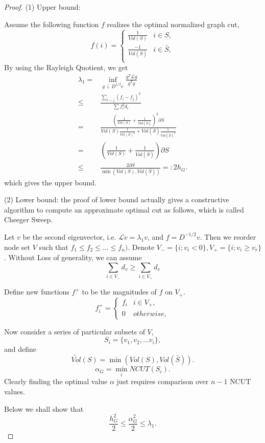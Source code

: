 \documentclass[twoside]{article}
\theoremstyle{definition}
\theoremstyle{definition}
\theoremstyle{remark}
\def\L{{\mathcal L}}
\begin{document}
\begin{proof}
(1) Upper bound:

Assume the following function $f$ realizes the optimal normalized graph cut,
\[
f(i)=
\left\{
\begin{array}{cc}
\frac{1}{Vol(S)} & i\in S , \\
\frac{-1}{Vol(\bar{S})} & i\in \bar{S} ,\\
\end{array}
\right.
\]
By using the Rayleigh Quotient, we get
\begin{equation*}
\begin{split}
\lambda_1=&\inf_{g\perp D^{1/2}e}\frac{g^T\mathcal L g}{g^Tg}\\
\le & \frac{\sum_{i\sim j}(f_i-f_j)^2}{\sum f_i^2d_i}\\
=& \frac{(\frac{1}{Vol(S)}+\frac{1}{Vol(\bar{S})})^2\partial S}{Vol(S)\frac{1}{Vol(S)^2}+Vol(\bar{S})\frac{1}{Vol(\bar{S})^2}}\\
=& (\frac{1}{Vol(S)}+\frac{1}{Vol(\bar{S})})\partial S\\
\le & \frac{2\partial S}{\min (Vol(S),Vol(\bar{S}))}=: 2 h_G.
\end{split}
\end{equation*}
which gives the upper bound.

(2) Lower bound: the proof of lower bound actually gives a constructive algorithm to compute an approximate optimal cut as follows, which is called Cheeger Sweep.

Let $v$ be the second eigenvector, i.e. $\L v = \lambda_1 v$, and $f = D^{-1/2}v$. Then we reorder node set $V$ such that $f_1\le f_2\le ...\le f_n)$. Denote $V_{-}=\{i;v_i< 0\},V_{+}=\{i;v_i\ge v_r\}$. Without Loss of generality, we can assume
$$ \sum_{i\in V_{-}}d_v \ge \sum_{i\in V_{+}}d_v$$

Define new functions $f^+$ to be the magnitudes of $f$ on $V_+$.
\[
f_i^{+}=\left\{
\begin{array}{cc}
f_i & i\in V_{+},\\
0 & otherwise,
\end{array}
\right.
\]

Now consider a series of particular subsets of $V$,
$$S_i=\{v_1,v_2,...v_i\},$$
and define
$$\widetilde{Vol}(S)=\min (Vol(S),Vol(\bar{S})).$$
$$\alpha_G=\min_{i}NCUT(S_{i}).$$
Clearly finding the optimal value $\alpha$ just requires comparison over $n-1$ NCUT values.

Below we shall show that $$\frac{h_G^2}{2}\le\frac{\alpha_G^2}{2}\le\lambda_1.$$


\end{proof}
\end{document}
